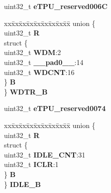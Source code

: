 \begin{DoxyCompactItemize}
\begin{tabbing}
\end{tabbing}\item 
\mbox{\label{structETPU__tag_a8beb08c22410b90aa8802d3685a657d1}} 
uint32\+\_\+t {\bfseries e\+T\+P\+U\+\_\+reserved006C}
\item 
\mbox{\label{structETPU__tag_a6fd85f0164d0d744e1b18361bb43b39f}} 
\begin{tabbing}
xx\=xx\=xx\=xx\=xx\=xx\=xx\=xx\=xx\=\kill
union \{\\
\>uint32\_t {\bfseries R}\\
\>struct \{\\
\>\>uint32\_t {\bfseries WDM}:2\\
\>\>uint32\_t {\bfseries \_\_pad0\_\_}:14\\
\>\>uint32\_t {\bfseries WDCNT}:16\\
\>\} {\bfseries B}\\
\} {\bfseries WDTR\_B}\\

\end{tabbing}\item 
\mbox{\label{structETPU__tag_ade6f5e7857455e4342cd1ac124067b96}} 
uint32\+\_\+t {\bfseries e\+T\+P\+U\+\_\+reserved0074}
\item 
\mbox{\label{structETPU__tag_abd44afa7c65aa7aae543fa8bbc8824d3}} 
\begin{tabbing}
xx\=xx\=xx\=xx\=xx\=xx\=xx\=xx\=xx\=\kill
union \{\\
\>uint32\_t {\bfseries R}\\
\>struct \{\\
\>\>uint32\_t {\bfseries IDLE\_CNT}:31\\
\>\>uint32\_t {\bfseries ICLR}:1\\
\>\} {\bfseries B}\\
\} {\bfseries IDLE\_B}\\


\end{tabbing}
\end{DoxyCompactItemize}
